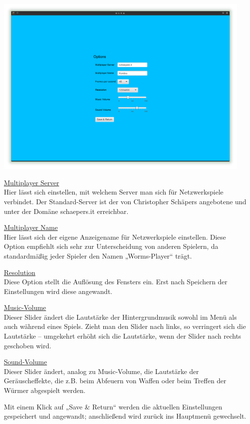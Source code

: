 \documentclass{scrreprt}
\begin{document}
\includegraphics[height=9cm]{Screenshot2.png}

\underline{Multiplayer Server}\\
Hier lässt sich einstellen, mit welchem Server man sich für Netzwerkspiele verbindet. Der Standard-Server ist der von
Christopher Schäpers angebotene und unter der Domäne schaepers.it erreichbar.

\underline{Multiplayer Name}\\
Hier lässt sich der eigene Anzeigename für Netzwerkspiele einstellen. Diese Option empfiehlt sich sehr zur Unterscheidung von anderen Spielern, da standardmäßig jeder Spieler den Namen „Worms-Player“ trägt.

\underline{Resolution}\\
Diese Option stellt die Auflösung des Fensters ein. Erst nach Speichern der Einstellungen wird diese angewandt.

\underline{Music-Volume}\\
Dieser Slider ändert die Lautstärke der Hintergrundmusik sowohl im Menü als auch während eines Spiels. Zieht man den Slider nach links, so verringert sich die Lautstärke – umgekehrt erhöht sich die Lautstärke, wenn der Slider nach rechts geschoben wird.

\underline{Sound-Volume}\\
Dieser Slider ändert, analog zu Music-Volume, die Lautstärke der Geräuscheffekte, die z.B. beim Abfeuern von Waffen oder beim Treffen
der Würmer abgespielt werden.

Mit einem Klick auf „Save \& Return“ werden die aktuellen Einstellungen gespeichert und angewandt; anschließend wird zurück ins Hauptmenü gewechselt.
\end{document}
